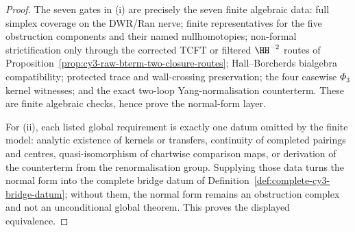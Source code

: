 \begin{proof}
The seven gates in (i) are precisely the seven finite algebraic data:
full simplex coverage on the DWR/Ran nerve; finite representatives for the
five obstruction components and their named nullhomotopies; non-formal
strictification only through the corrected TCFT or filtered
$\HH^{-2}$ routes of
Proposition~\ref{prop:cy3-raw-bterm-two-closure-routes};
Hall--Borcherds bialgebra compatibility;
protected trace and wall-crossing preservation; the four casewise
$\Phi_3$ kernel witnesses; and the exact two-loop Yang-normalisation
counterterm. These are finite algebraic checks, hence prove the
normal-form layer.

For (ii), each listed global requirement is exactly one datum omitted by
the finite model: analytic existence of kernels or transfers,
continuity of completed pairings and centres, quasi-isomorphism of
chartwise comparison maps, or derivation of the counterterm from the
renormalisation group. Supplying those data turns the normal form into
the complete bridge datum of Definition~\ref{def:complete-cy3-bridge-datum};
without them, the normal form remains an obstruction complex and not an
unconditional global theorem. This proves the displayed equivalence.
\end{proof}

